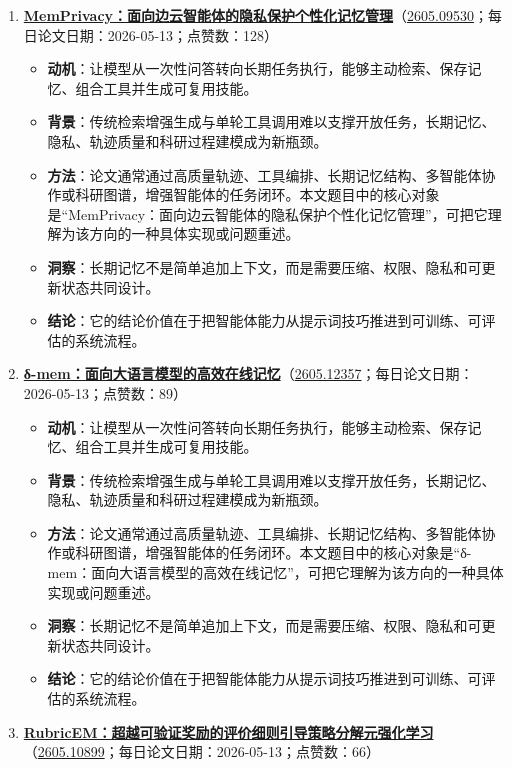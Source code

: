 \begin{enumerate}[leftmargin=1.5em]
  \item \textbf{\href{https://huggingface.co/papers/2605.09530}{MemPrivacy：面向边云智能体的隐私保护个性化记忆管理}}（\href{https://arxiv.org/abs/2605.09530}{2605.09530}；每日论文日期：2026-05-13；点赞数：128）
  \begin{itemize}[leftmargin=1.5em]
    \item \textbf{动机}：让模型从一次性问答转向长期任务执行，能够主动检索、保存记忆、组合工具并生成可复用技能。
    \item \textbf{背景}：传统检索增强生成与单轮工具调用难以支撑开放任务，长期记忆、隐私、轨迹质量和科研过程建模成为新瓶颈。
    \item \textbf{方法}：论文通常通过高质量轨迹、工具编排、长期记忆结构、多智能体协作或科研图谱，增强智能体的任务闭环。本文题目中的核心对象是“MemPrivacy：面向边云智能体的隐私保护个性化记忆管理”，可把它理解为该方向的一种具体实现或问题重述。
    \item \textbf{洞察}：长期记忆不是简单追加上下文，而是需要压缩、权限、隐私和可更新状态共同设计。
    \item \textbf{结论}：它的结论价值在于把智能体能力从提示词技巧推进到可训练、可评估的系统流程。
  \end{itemize}
  \item \textbf{\href{https://huggingface.co/papers/2605.12357}{δ-mem：面向大语言模型的高效在线记忆}}（\href{https://arxiv.org/abs/2605.12357}{2605.12357}；每日论文日期：2026-05-13；点赞数：89）
  \begin{itemize}[leftmargin=1.5em]
    \item \textbf{动机}：让模型从一次性问答转向长期任务执行，能够主动检索、保存记忆、组合工具并生成可复用技能。
    \item \textbf{背景}：传统检索增强生成与单轮工具调用难以支撑开放任务，长期记忆、隐私、轨迹质量和科研过程建模成为新瓶颈。
    \item \textbf{方法}：论文通常通过高质量轨迹、工具编排、长期记忆结构、多智能体协作或科研图谱，增强智能体的任务闭环。本文题目中的核心对象是“δ-mem：面向大语言模型的高效在线记忆”，可把它理解为该方向的一种具体实现或问题重述。
    \item \textbf{洞察}：长期记忆不是简单追加上下文，而是需要压缩、权限、隐私和可更新状态共同设计。
    \item \textbf{结论}：它的结论价值在于把智能体能力从提示词技巧推进到可训练、可评估的系统流程。
  \end{itemize}
  \item \textbf{\href{https://huggingface.co/papers/2605.10899}{RubricEM：超越可验证奖励的评价细则引导策略分解元强化学习}}（\href{https://arxiv.org/abs/2605.10899}{2605.10899}；每日论文日期：2026-05-13；点赞数：66）

\end{enumerate}
